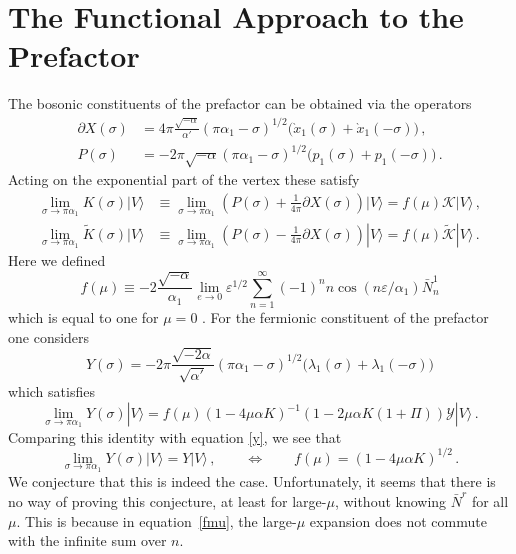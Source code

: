 \documentclass[12pt]{article}
\def\a{\alpha}
\def\e{\varepsilon}
\def\m{\mu}
\def\s{\sigma}
\def\l{\lambda}
\def\mc{\mathcal}
\def\p{\partial}
\def\ra{\rangle}
\def\wt{\widetilde}
\numberwithin{equation}{section} \setlength{\textwidth}{17cm}
\begin{document}
\section{The Functional Approach to the Prefactor}\label{appf}
\setcounter{section}{4}
\renewcommand{\thesection}{\Alph{section}}
\setcounter{equation}{0}
The bosonic constituents of the prefactor can be obtained via the operators~\cite{gs,gsb}
\begin{equation}
\begin{split}
\p X(\s) & =
4\pi\frac{\sqrt{-\a}}{\a'}(\pi\a_1-\s)^{1/2}\bigl(\grave{x}_1(\s)+\grave{x}_1(-\s)\bigr)\,,\\
\label{p}
P(\s) &=-2\pi\sqrt{-\a}(\pi\a_1-\s)^{1/2}\bigl(p_1(\s)+p_1(-\s)\bigr)\,.
\end{split}
\end{equation}
Acting on the exponential part of the vertex these satisfy
\begin{equation}\label{pp}
\begin{split}
\lim_{\s\to\pi\a_1}K(\s)|V\ra & \equiv
\lim_{\s\to\pi\a_1}\left(P(\s)+\frac{1}{4\pi}\p X(\s)\right)|V\ra
=f(\m){\mc K}|V\ra\,,\\
\lim_{\s\to\pi\a_1}\wt{K}(\s)|V\ra & \equiv
\lim_{\s\to\pi\a_1}\left(P(\s)-\frac{1}{4\pi}\p X(\s)\right)|V\ra
=f(\m)\wt{\mc K}|V\ra\,.
\end{split}
\end{equation}
Here we defined
\begin{equation}\label{fmu}
f(\m)\equiv-2\frac{\sqrt{-\a}}{\a_1}\lim_{e\to0}\e^{1/2}\sum_{n=1}^{\infty}(-1)^nn\cos(n\e/\a_1)\bar{N}^1_n
\end{equation}
which is equal to one for $\m=0$ \cite{gs}. For the fermionic constituent of the prefactor
one considers~\cite{gs,gsb}
\begin{equation}
Y(\s)=-2\pi\frac{\sqrt{-2\a}}{\sqrt{\a'}}(\pi\a_1-\s)^{1/2}\bigl(\l_1(\s)+\l_1(-\s)\bigr)
\end{equation}
which satisfies \cite{ap}
\begin{equation}
\lim_{\s\to\pi\a_1}Y(\s)|V\ra=f(\m)(1-4\m\a K)^{-1}(1-2\m\a K(1+\Pi)){\mc Y}|V\ra\,.
\end{equation}
Comparing this identity with equation \eqref{y}, we see that
\begin{equation}
\lim_{\s\to\pi\a_1}Y(\s)|V\ra=Y|V\ra\,,\qquad\Longleftrightarrow\qquad
f(\m)=(1-4\m\a K)^{1/2}\,.
\end{equation}
We conjecture that this is indeed the case. Unfortunately, it seems that there is no way
of proving this conjecture, at least for large-$\m$, without knowing $\bar{N}^r$
for all $\m$. This is because in equation~\eqref{fmu}, the large-$\m$ expansion does not commute with the infinite sum 
over $n$. 
\end{document}
